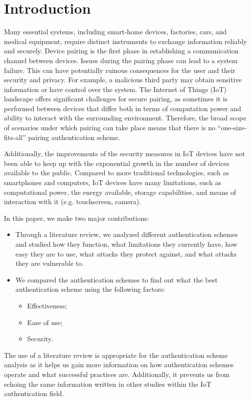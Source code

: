 \documentclass[10pt,twocolumn,letterpaper]{article}
\begin{document}
\section{Introduction}
Many essential systems, including smart-home devices, factories, cars, and medical equipment, require distinct instruments to exchange information reliably and securely. Device pairing is the first phase in establishing a communication channel between devices. Issues during the pairing phase can lead to a system failure. This can have potentially ruinous consequences for the user and their security and privacy. For example, a malicious third party may obtain sensitive information or have control over the system. The Internet of Things (IoT) landscape offers significant challenges for secure pairing, as sometimes it is performed between devices that differ both in terms of computation power and ability to interact with the surrounding environment. Therefore, the broad scope of scenarios under which pairing can take place means that there is no “one-size-fits-all” pairing authentication scheme. 

Additionally, the improvements of the security measures in IoT devices have not been able to keep up with the exponential growth in the number of devices available to the public. Compared to more traditional technologies, such as smartphones and computers, IoT devices have many limitations, such as computational power, the energy available, storage capabilities, and means of interaction with it (e.g. touchscreen, camera).

In this paper, we make two major contributions:
\begin{itemize}
    \item Through a literature review, we analyzed different authentication schemes and studied how they function, what limitations they currently have, how easy they are to use, what attacks they protect against, and what attacks they are vulnerable to.
    \item We compared the authentication schemes to find out what the best authentication scheme using the following factors:
    \begin{itemize}
        \item Effectiveness;
        \item Ease of use;
        \item Security.
    \end{itemize}
\end{itemize}

The use of a literature review is appropriate for the authentication scheme analysis as it helps us gain more information on how authentication schemes operate and what successful practices are. Additionally, it prevents us from echoing the same information written in other studies within the IoT authentication field.
\end{document}
